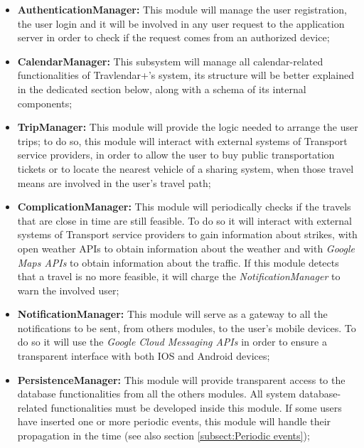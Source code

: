 \begin{itemize}
	\item \textbf{AuthenticationManager:} This module will manage the user registration, the user login and it will be involved in any user request to the application server in order to check if the request comes from an authorized device;
	\item \textbf{CalendarManager:} This subsystem will manage all calendar-related functionalities of Travlendar+'s system, its structure will be better explained in the dedicated section below, along with a schema of its internal components;
	\item \textbf{TripManager:} This module will provide the logic needed to arrange the user trips; to do so, this module will interact with external systems of Transport service providers, in order to allow the user to buy public transportation tickets or to locate the nearest vehicle of a sharing system, when those travel means are involved in the user's travel path;
	\item \textbf{ComplicationManager:} This module will periodically checks if the travels that are close in time are still feasible. To do so it will interact with external systems of Transport service providers to gain information about strikes, with open weather APIs to obtain information about the weather and with \textit{Google Maps APIs} to obtain information about the traffic. If this module detects that a travel is no more feasible, it will charge the \textit{NotificationManager} to warn the involved user;
	\item \textbf{NotificationManager:} This module will serve as a gateway to all the notifications to be sent, from others modules, to the user's mobile devices. To do so it will use the \textit{Google Cloud Messaging APIs} in order to ensure a transparent interface with both IOS and Android devices;
	\item \textbf{PersistenceManager:} This module will provide transparent access to the database functionalities from all the others modules. All system database-related functionalities must be developed inside this module. If some users have inserted one or more periodic events, this module will handle their propagation in the time (see also section \ref{subsect:Periodic events}); 
\end{itemize}

